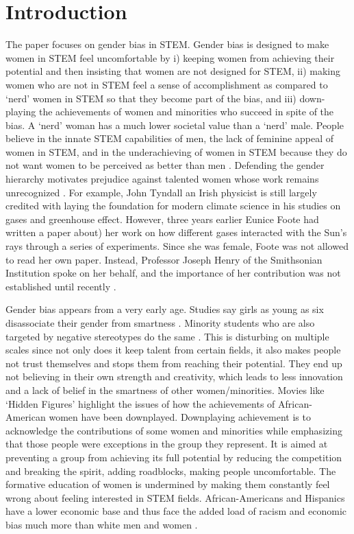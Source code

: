 \documentclass[utf8]{frontiersSCNS} %
\begin{document}
\section{Introduction}
The paper focuses on gender bias in STEM. Gender bias is designed to make women in STEM feel uncomfortable by i) keeping women from achieving their potential and then insisting that women are not designed for STEM, ii) making women who are not in STEM feel a sense of accomplishment as compared to `nerd’ women in STEM so that they become part of the bias, and iii) down-playing the achievements of women and minorities who succeed in spite of the bias. A `nerd’ woman has a much lower societal value than a `nerd’ male. People believe in the innate STEM capabilities of men, the lack of feminine appeal of women in STEM, and in the underachieving of women in STEM because they do not want women to be perceived as better than men \citep{rudman2012status}.   Defending the gender hierarchy motivates prejudice against talented women whose work remains unrecognized \citep{rudman2012status}. For example, John Tyndall an Irish physicist is still largely credited with laying the foundation for modern climate science in his studies on gases and greenhouse effect. However, three years earlier Eunice Foote had written a paper about) her work on how different gases interacted with the Sun’s rays through a series of experiments. Since she was female, Foote was not allowed to read her own paper. Instead, Professor Joseph Henry of the Smithsonian Institution spoke on her behalf, and the importance of her contribution was not established until recently \citep{mcneil2016lady}.

Gender bias appears from a very early age. Studies say girls as young as six disassociate their gender from smartness \citep{bian2018messages}. Minority students who are also targeted by negative stereotypes do the same \citep{fine1984racial}. This is disturbing on multiple scales since not only does it keep talent from certain fields, it also makes people not trust themselves and stops them from reaching their potential. They end up not believing in their own strength and creativity, which leads to less innovation and a lack of belief in the smartness of other women/minorities. Movies like ‘Hidden Figures’ highlight the issues of how the achievements of African-American women have been downplayed. Downplaying achievement is to acknowledge the contributions of some women and minorities while emphasizing that those people were exceptions in the group they represent. It is aimed at preventing a group from achieving its full potential by reducing the competition and breaking the spirit, adding roadblocks, making people uncomfortable. The formative education of women is undermined by making them constantly feel wrong about feeling interested in STEM fields. African-Americans and Hispanics have a lower economic base and thus face the added load of racism and economic bias much more than white men and women \citep{BlackEco2,BlackEco1}.
\end{document}
